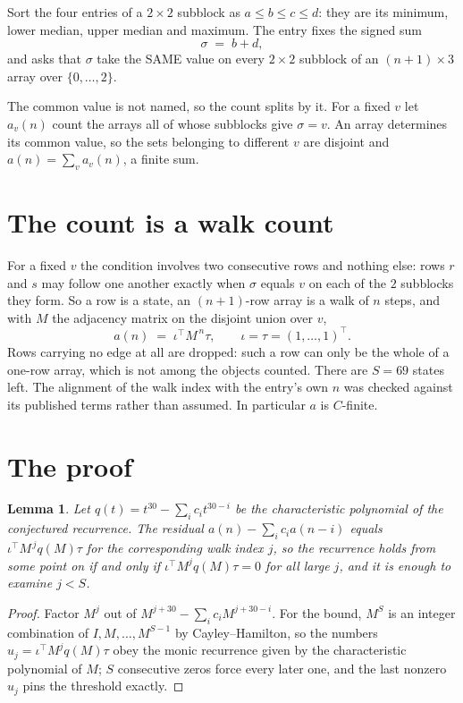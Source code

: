 \documentclass[11pt,a4paper]{article}
\theoremstyle{plain}
\newtheorem{lemma}[theorem]{Lemma}
\theoremstyle{definition}
\begin{document}
Sort the four entries of a $2\times2$ subblock as $a\le b\le c\le d$: they
are its minimum, lower median, upper median and maximum. The entry fixes the signed sum
\[
\sigma\;=\;b+d,
\]
and asks that $\sigma$ take the SAME value on every $2\times2$ subblock of an
$(n+1)\times3$ array over $\{0,\dots,2\}$.

The common value is not named, so the count splits by it. For a fixed $v$ let $a_v(n)$ count
the arrays all of whose subblocks give $\sigma=v$. An array determines its common value, so
the sets belonging to different $v$ are disjoint and $a(n)=\sum_v a_v(n)$, a finite sum.


\section{The count is a walk count}

For a fixed $v$ the condition involves two consecutive rows and nothing
else: rows $r$ and $s$ may follow one another exactly when $\sigma$ equals $v$ on each of the
$2$ subblocks they form. So a row is a state, an $(n+1)$-row array is a walk of $n$
steps, and with $M$ the adjacency matrix on the disjoint union over $v$,
\[
a(n)\;=\;\iota^{\!\top}M^{\,n}\tau,\qquad\iota=\tau=(1,\dots,1)^{\!\top} .
\]
Rows carrying no edge at all are dropped: such a row can only be the whole of a one-row
array, which is not among the objects counted. There are $S=69$ states left.
The alignment of the walk index with the entry's own $n$ was checked against its published
terms rather than assumed. In particular $a$ is $C$-finite.

\section{The proof}

\begin{lemma}\label{lem:crit}
Let $q(t)=t^{30}-\sum_i c_it^{30-i}$ be the characteristic polynomial of the
conjectured recurrence. The residual $a(n)-\sum_ic_ia(n-i)$ equals
$\iota^{\!\top}M^{\,j}q(M)\tau$ for the corresponding walk index $j$, so the recurrence
holds from some point on if and only if $\iota^{\!\top}M^{j}q(M)\tau=0$ for all large $j$,
and it is enough to examine $j<S$.
\end{lemma}

\begin{proof}
Factor $M^{j}$ out of $M^{j+30}-\sum_ic_iM^{j+30-i}$. For the bound, $M^{S}$
is an integer combination of $I,M,\dots,M^{S-1}$ by Cayley--Hamilton, so the numbers
$u_j=\iota^{\!\top}M^{j}q(M)\tau$ obey the monic recurrence given by the characteristic
polynomial of $M$; $S$ consecutive zeros force every later one, and the last nonzero $u_j$
pins the threshold exactly.
\end{proof}
\end{document}
